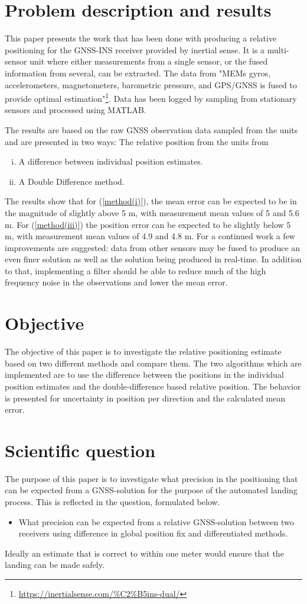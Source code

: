 \section{Problem description and results}
This paper presents the work that has been done with producing a relative positioning for the GNSS-INS receiver provided by inertial sense. It is a multi-sensor unit where either measurements from a single sensor, or the fused information from several, can be extracted. The data from "MEMs gyros, accelerometers, magnetometers, barometric pressure, and GPS/GNSS is fused to provide optimal estimation"\footnote{\url{https://inertialsense.com/\%C2\%B5ins-dual/}}. Data has been logged by sampling from stationary sensors and processed using MATLAB. 
\par
The results are based on the raw GNSS observation data sampled from the units and are presented in two ways: The relative position from the units from
\begin{enumerate}[(i)]
\item A difference between individual position estimates. \label{method(i)}
\item A Double Difference method. \label{method(iii)}
\end{enumerate}
The results show that for (\ref{method(i)}), the mean error can be expected to be in the magnitude of slightly above 5 m, with measurement mean values of 5 and 5.6 m. For (\ref{method(iii)}) the position error can be expected to be slightly below 5 m, with measurement mean values of 4.9 and 4.8 m. For a continued work a few improvements are suggested: data from other sensors may be fused to produce an even finer solution as well as the solution being produced in real-time. In addition to that, implementing a filter should be able to reduce much of the high frequency noise in the observations and lower the mean error.
\section{Objective} \label{sectionObjective}
The objective of this paper is to investigate the relative positioning estimate based on two different methods and compare them. The two algorithms which are implemented are to use the difference between the positions in the individual position estimates and the double-difference based relative position. The behavior is presented for uncertainty in position per direction and the calculated mean error.
\section{Scientific question}
The purpose of this paper is to investigate what precision in the positioning that can be expected from a GNSS-solution for the purpose of the automated landing process. This is reflected in the question, formulated below.
\begin{itemize}
\item What precision can be expected from a relative GNSS-solution between two receivers using difference in global position fix and differentiated methods.
\end{itemize}
Ideally an estimate that is correct to within one meter would ensure that the landing can be made safely.

